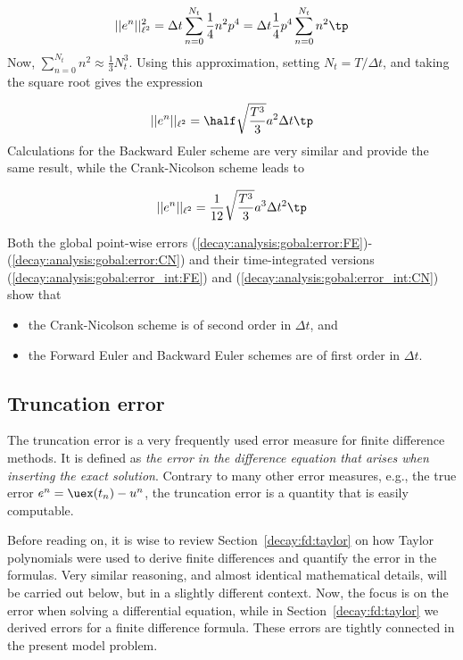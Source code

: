 \documentclass[graybox,sectrefs,envcountresetchap,open=right,final]{svmonodo}
\newenvironment{summary_mdfboxadmon}[1][]{
\begin{summary_mdfboxmdframed}[frametitle=#1]
}
{
\end{summary_mdfboxmdframed}
}
\begin{document}
\[
||e^n||_{\ell^2}^2 = \Delta t\sum_{n=0}^{N_t} \frac{1}{4}n^2p^4
=\Delta t\frac{1}{4}p^4 \sum_{n=0}^{N_t} n^2\tp
\]
Now, $\sum_{n=0}^{N_t} n^2\approx \frac{1}{3}N_t^3$. Using this approximation,
setting $N_t =T/\Delta t$, and taking the square root gives the expression

\begin{equation}
||e^n||_{\ell^2} = \half\sqrt{\frac{T^3}{3}} a^2\Delta t\tp
\label{decay:analysis:gobal:error_int:FE}
\end{equation}
Calculations for the Backward Euler scheme are very similar and provide
the same result, while the Crank-Nicolson scheme leads to

\begin{equation}
||e^n||_{\ell^2} = \frac{1}{12}\sqrt{\frac{T^3}{3}}a^3\Delta t^2\tp
\label{decay:analysis:gobal:error_int:CN}
\end{equation}


\begin{summary_mdfboxadmon}
Both the global point-wise errors (\ref{decay:analysis:gobal:error:FE})-(\ref{decay:analysis:gobal:error:CN})
and their time-integrated versions (\ref{decay:analysis:gobal:error_int:FE}) and (\ref{decay:analysis:gobal:error_int:CN}) show that

\begin{itemize}
 \item the Crank-Nicolson scheme is of second order in $\Delta t$, and

 \item the Forward Euler and Backward Euler schemes are of first order in $\Delta t$.
\end{itemize}

\noindent
\end{summary_mdfboxadmon}



\subsection{Truncation error}
\label{decay:analysis:trunc}

The truncation error is a very frequently used error measure for
finite difference methods. It is defined as \emph{the error
in the difference equation that arises when inserting the exact
solution}. Contrary to many other error measures, e.g., the
true error $e^n=\uex(t_n)-u^n$, the truncation error is a quantity that
is easily computable.

Before reading on, it is wise to review Section~\ref{decay:fd:taylor}
on how Taylor polynomials were used to derive finite differences and
quantify the error in the formulas. Very similar reasoning, and almost
identical mathematical details, will be carried out below, but in a slightly
different context. Now, the
focus is on the error when solving a differential
equation, while in Section~\ref{decay:fd:taylor} we derived
errors for a finite difference formula. These errors are tightly
connected in the present model problem.
\end{document}
